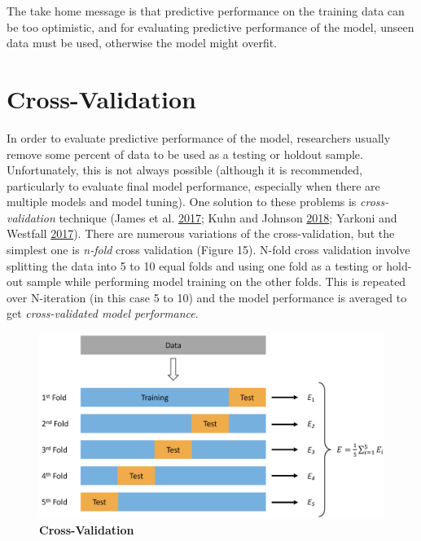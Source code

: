 \documentclass[
]{book}
\begin{document}
The take home message is that predictive performance on the training data can be too optimistic, and for evaluating predictive performance of the model, unseen data must be used, otherwise the model might overfit.

\hypertarget{cross-validation}{%
\section{Cross-Validation}\label{cross-validation}}

In order to evaluate predictive performance of the model, researchers usually remove some percent of data to be used as a testing or holdout sample. Unfortunately, this is not always possible (although it is recommended, particularly to evaluate final model performance, especially when there are multiple models and model tuning). One solution to these problems is \emph{cross-validation} technique (James et al. \protect\hyperlink{ref-jamesIntroductionStatisticalLearning2017}{2017}; Kuhn and Johnson \protect\hyperlink{ref-kuhnAppliedPredictiveModeling2018}{2018}; Yarkoni and Westfall \protect\hyperlink{ref-yarkoniChoosingPredictionExplanation2017}{2017}). There are numerous variations of the cross-validation, but the simplest one is \emph{n-fold} cross validation (Figure 15). N-fold cross validation involve splitting the data into 5 to 10 equal folds and using one fold as a testing or hold-out sample while performing model training on the other folds. This is repeated over N-iteration (in this case 5 to 10) and the model performance is averaged to get \emph{cross-validated model performance}.

\begin{figure}

{\centering \includegraphics[width=0.9\linewidth]{figures/cross-validation} 

}

\caption{\textbf{Cross-Validation}}\label{fig:cross-validation}
\end{figure}
\end{document}
